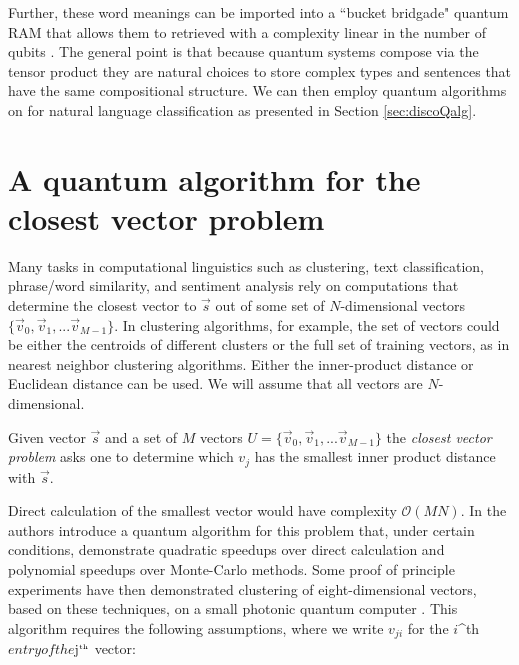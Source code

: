 Further, these word meanings can be imported into a ``bucket bridgade" quantum RAM that allows them to retrieved with a complexity linear in the number of qubits \cite{giovannetti2008quantum}. The general point is that because quantum systems compose via the tensor product they are natural choices to store complex types and sentences that have the same compositional structure. We can then employ quantum algorithms on for natural language classification as presented in Section \ref{sec:discoQalg}.

\section{A quantum algorithm for the closest vector problem}
\label{sec:qalg}

Many tasks in computational linguistics such as clustering, text classification, phrase/word similarity, and sentiment analysis rely on computations that determine the closest vector to $\vec{s}$ out of some set of $N$-dimensional vectors $\{\vec{v}_0,\vec{v}_1,...\vec{v}_{M-1}\}$. In clustering algorithms, for example, the set of vectors could be either the centroids of different clusters or the full set of training vectors, as in nearest neighbor clustering algorithms. Either the inner-product distance or Euclidean distance can be used. We will assume that all vectors are $N$-dimensional.
\begin{definition}
Given vector $\vec{s}$ and a set of $M$ vectors $U = \{\vec{v}_0,\vec{v}_1,...\vec{v}_{M-1}\}$ the \emph{closest vector problem} asks one to determine which $v_j$ has the smallest inner product distance with $\vec{s}$.
\end{definition}
Direct calculation of the smallest vector would have complexity $\mathcal{O}(MN)$.  In \cite{wiebe2014quantum} the authors introduce a quantum algorithm for this problem that, under certain conditions, demonstrate quadratic speedups over direct calculation and polynomial speedups over Monte-Carlo methods. Some proof of principle experiments have then demonstrated clustering of eight-dimensional vectors, based on these techniques, on a small photonic quantum computer \cite{cai2015entanglement}. This algorithm requires the following assumptions, where we write $v_{ji}$ for the $i$^{\tiny\mbox{th}}$ entry of the $j$^{\tiny\mbox{th}}$ vector:
